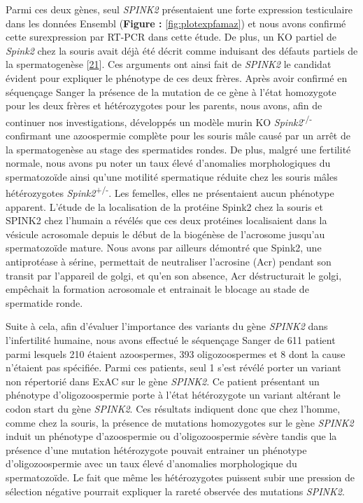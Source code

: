 \documentclass[12pt,twoside]{ugathesis}
\begin{document}
Parmi ces deux gènes, seul \emph{SPINK2} présentaient une forte
expression testiculaire dans les données Ensembl (\textbf{Figure :
}\ref{fig:plotexpfamaz}) et nous avons confirmé cette surexpression par
RT-PCR dans cette étude. De plus, un KO partiel de \emph{Spink2} chez la
souris avait déjà été décrit comme induisant des défauts partiels de la
spermatogenèse {[}\protect\hyperlink{ref-Lee2011}{21}{]}. Ces arguments
ont ainsi fait de \emph{SPINK2} le candidat évident pour expliquer le
phénotype de ces deux frères. Après avoir confirmé en séquençage Sanger
la présence de la mutation de ce gène à l'état homozygote pour les deux
frères et hétérozygotes pour les parents, nous avons, afin de continuer
nos investigations, développés un modèle murin KO
\emph{Spink2}\textsuperscript{-/-} confirmant une azoospermie complète
pour les souris mâle causé par un arrêt de la spermatogenèse au stage
des spermatides rondes. De plus, malgré une fertilité normale, nous
avons pu noter un taux élevé d'anomalies morphologiques du spermatozoïde
ainsi qu'une motilité spermatique réduite chez les souris mâles
hétérozygotes \emph{Spink2}\textsuperscript{+/-}. Les femelles, elles ne
présentaient aucun phénotype apparent. L'étude de la localisation de la
protéine Spink2 chez la souris et SPINK2 chez l'humain a révélés que ces
deux protéines localisaient dans la vésicule acrosomale depuis le début
de la biogénèse de l'acrosome jusqu'au spermatozoïde mature. Nous avons
par ailleurs démontré que Spink2, une antiprotéase à sérine, permettait
de neutraliser l'acrosine (Acr) pendant son transit par l'appareil de
golgi, et qu'en son absence, Acr déstructurait le golgi, empêchait la
formation acrosomale et entrainait le blocage au stade de spermatide
ronde.

Suite à cela, afin d'évaluer l'importance des variants du gène
\emph{SPINK2} dans l'infertilité humaine, nous avons effectué le
séquençage Sanger de 611 patient parmi lesquels 210 étaient azoospermes,
393 oligozoospermes et 8 dont la cause n'étaient pas spécifiée. Parmi
ces patients, seul 1 s'est révélé porter un variant non répertorié dans
ExAC sur le gène \emph{SPINK2}. Ce patient présentant un phénotype
d'oligozoospermie porte à l'état hétérozygote un variant altérant le
codon start du gène \emph{SPINK2}. Ces résultats indiquent donc que chez
l'homme, comme chez la souris, la présence de mutations homozygotes sur
le gène \emph{SPINK2} induit un phénotype d'azoospermie ou
d'oligozoospermie sévère tandis que la présence d'une mutation
hétérozygote pouvait entrainer un phénotype d'oligozoospermie avec un
taux élevé d'anomalies morphologique du spermatozoïde. Le fait que même
les hétérozygotes puissent subir une pression de sélection négative
pourrait expliquer la rareté observée des mutations \emph{SPINK2}.
\end{document}
